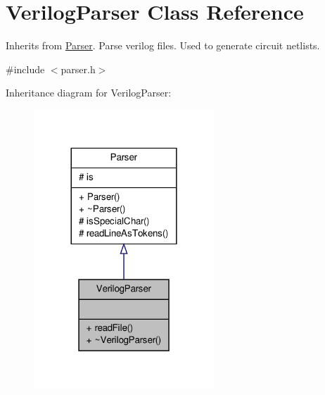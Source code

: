 \hypertarget{classVerilogParser}{\section{Verilog\-Parser Class Reference}
\label{classVerilogParser}
}


Inherits from \hyperlink{classParser}{Parser}. Parse verilog files. Used to generate circuit netlists.  




{\ttfamily \#include $<$parser.\-h$>$}



Inheritance diagram for Verilog\-Parser\-:\nopagebreak
\begin{figure}[H]
\begin{center}
\leavevmode
\includegraphics[width=192pt]{classVerilogParser__inherit__graph}
\end{center}
\end{figure}


